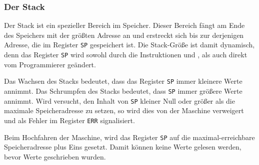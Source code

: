\subsubsection{Der Stack}
\label{subsubsec:Stack}

Der Stack ist ein spezieller Bereich im Speicher. Dieser Bereich fängt am Ende
des Speichers mit der größten Adresse an und erstreckt sich bis zur derjenigen
Adresse, die im Register \texttt{SP} gespeichert ist. Die Stack-Größe ist damit
dynamisch, denn das Register \texttt{SP} wird sowohl durch die Instruktionen
 und , als auch direkt vom Programmierer geändert.

Das Wachsen des Stacks bedeutet, dass das Register
\texttt{SP} immer kleinere Werte annimmt. Das Schrumpfen
des Stacks bedeutet, dass \texttt{SP} immer größere Werte annimmt. Wird
versucht, den Inhalt von \texttt{SP} kleiner Null oder größer als die maximale
Speicheradresse zu setzen, so wird dies von der Maschine verweigert und als
Fehler im Register \texttt{ERR} signalisiert.

Beim Hochfahren der Maschine, wird das Register \texttt{SP} auf die
maximal-erreichbare Speicheradresse plus Eins gesetzt. Damit können keine Werte
gelesen werden, bevor Werte geschrieben wurden.

